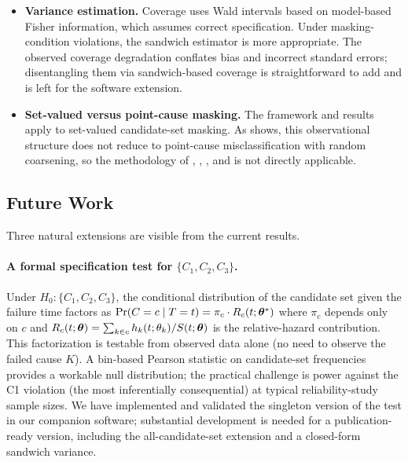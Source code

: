 \begin{itemize}
    \item \textbf{Variance estimation.} Coverage uses Wald intervals
        based on model-based Fisher information, which assumes correct
        specification. Under masking-condition violations, the sandwich
        estimator \citep{huber1967behavior, white1982misspecified} is
        more appropriate. The observed coverage degradation conflates
        bias and incorrect standard errors; disentangling them via
        sandwich-based coverage is straightforward to add and is left
        for the software extension.

    \item \textbf{Set-valued versus point-cause masking.} The framework
        and results apply to set-valued candidate-set masking. As
         shows, this observational structure
        does not reduce to point-cause misclassification with random
        coarsening, so the methodology of \citet{Ebrahimi1996},
        \citet{VanRompaye2012}, \citet{MorenoBetancur2015}, and
        \citet{Bakoyannis2025} is not directly applicable.
\end{itemize}

\subsection{Future Work}
\label{sec:future}

Three natural extensions are visible from the current results.

\paragraph{A formal specification test for $\{C_1, C_2, C_3\}$.}
Under $H_0 \colon \{C_1, C_2, C_3\}$, the conditional distribution of
the candidate set given the failure time factors as
$\Pr(C = c \mid T = t) = \pi_c \cdot R_c(t; \bm{\theta}^*)$ where
$\pi_c$ depends only on $c$ and $R_c(t; \bm{\theta}) = \sum_{k \in c}
h_k(t; \theta_k) / S(t; \bm{\theta})$ is the relative-hazard contribution.
This factorization is testable from observed data alone (no need to
observe the failed cause $K$). A bin-based Pearson statistic on
candidate-set frequencies provides a workable null distribution; the
practical challenge is power against the C1 violation (the most
inferentially consequential) at typical reliability-study sample
sizes. We have implemented and validated the singleton version of the
test in our companion software; substantial development is needed for
a publication-ready version, including the all-candidate-set extension
and a closed-form sandwich variance.

